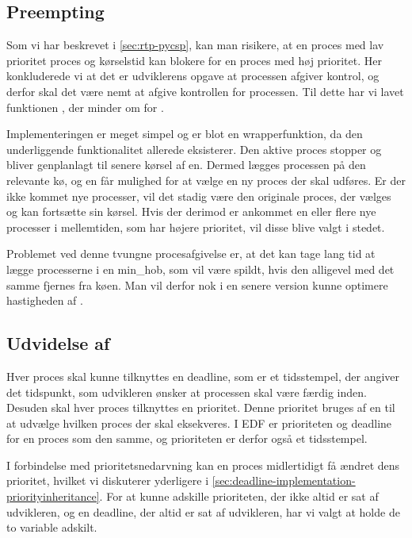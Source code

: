 \subsection{Preempting}

Som vi har beskrevet i \cref{sec:rtp-pycsp}, kan  man risikere, at en proces med lav prioritet proces og kørselstid kan blokere for en proces med høj prioritet. 
Her konkluderede vi at det er udviklerens opgave at processen afgiver kontrol, og derfor skal det være nemt at afgive kontrollen for processen. Til dette har vi lavet funktionen , der minder om  for .

Implementeringen er meget simpel og er blot en wrapperfunktion, da den underliggende funktionalitet allerede eksisterer. Den aktive proces stopper og bliver genplanlagt til senere kørsel af \sched en. Dermed lægges processen på den relevante kø, og  \sched en får mulighed for at vælge en ny proces der skal udføres. Er der ikke kommet nye processer, vil det stadig være den originale proces, der vælges og kan fortsætte sin kørsel. Hvis der derimod er ankommet en eller flere nye processer i mellemtiden, som har højere prioritet, vil disse blive valgt i stedet.

Problemet ved denne tvungne procesafgivelse er, at det kan tage lang tid at lægge processerne i en min\_hob, som vil være spildt, hvis den alligevel med det samme fjernes fra køen. Man vil derfor nok i en senere version kunne optimere hastigheden af .

\subsection{Udvidelse af }
Hver proces skal kunne tilknyttes en deadline, som er et tidsstempel, der angiver det tidspunkt, som udvikleren ønsker at processen skal være færdig inden. 
Desuden skal hver proces tilknyttes en prioritet. Denne prioritet bruges af \sched en til at udvælge hvilken proces der skal eksekveres. I EDF er prioriteten og deadline for en proces som  den samme, og prioriteten er derfor også et tidsstempel.

I forbindelse med prioritetsnedarvning kan en proces midlertidigt få ændret dens prioritet, hvilket vi diskuterer yderligere i \cref{sec:deadline-implementation-priorityinheritance}. For at kunne adskille prioriteten, der ikke altid er sat af udvikleren, og en deadline, der altid er sat af udvikleren, har vi  valgt at holde de to variable adskilt. 


